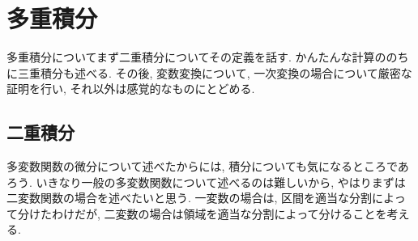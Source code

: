 \documentclass[a4j,dvipdfmx]{jsarticle}
\numberwithin{equation}{section}
\begin{document}
    \section{多重積分}
        多重積分についてまず二重積分についてその定義を話す. かんたんな計算ののちに三重積分も述べる. その後, 変数変換について, 一次変換の場合について厳密な証明を行い, 
        それ以外は感覚的なものにとどめる.
        \subsection{二重積分}
            多変数関数の微分について述べたからには, 積分についても気になるところであろう. いきなり一般の多変数関数について述べるのは難しいから, やはりまずは二変数関数の場合を述べたいと思う.
            一変数の場合は, 区間を適当な分割によって分けたわけだが, 二変数の場合は領域を適当な分割によって分けることを考える.
\end{document}

